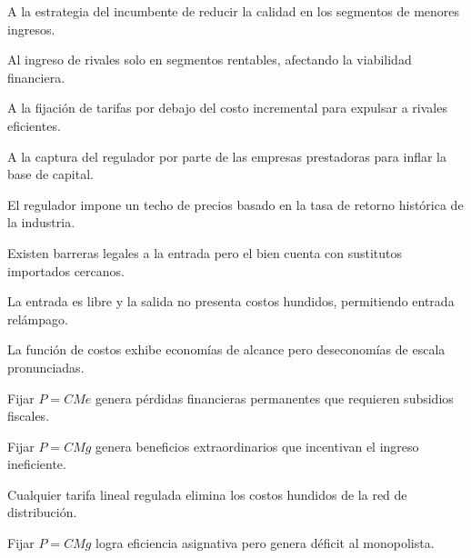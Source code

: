 \begin{opts}
    \item A la estrategia del incumbente de reducir la calidad en los segmentos de menores ingresos.
    \item Al ingreso de rivales solo en segmentos rentables, afectando la viabilidad financiera.
    \item A la fijación de tarifas por debajo del costo incremental para expulsar a rivales eficientes.
    \item A la captura del regulador por parte de las empresas prestadoras para inflar la base de capital.
\end{opts}

\begin{opts}
    \item El regulador impone un techo de precios basado en la tasa de retorno histórica de la industria.
    \item Existen barreras legales a la entrada pero el bien cuenta con sustitutos importados cercanos.
    \item La entrada es libre y la salida no presenta costos hundidos, permitiendo entrada relámpago.
    \item La función de costos exhibe economías de alcance pero deseconomías de escala pronunciadas.
\end{opts}

\begin{opts}
    \item Fijar $P = CMe$ genera pérdidas financieras permanentes que requieren subsidios fiscales.
    \item Fijar $P = CMg$ genera beneficios extraordinarios que incentivan el ingreso ineficiente.
    \item Cualquier tarifa lineal regulada elimina los costos hundidos de la red de distribución.
    \item Fijar $P = CMg$ logra eficiencia asignativa pero genera déficit al monopolista.
\end{opts}

